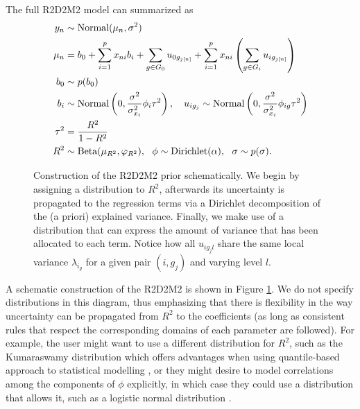 The full R2D2M2 model can summarized as
\begin{equation}
\label{r2d2m2model}
    \begin{aligned}
y_n & \sim \text{Normal} (\mu_n, \sigma^2) \\
\mu_n &= b_{0}+ \sum_{i=1}^p x_{ni} b_{i}+  \sum_{g\in G_0} u_{0 g_{j[n]}  }  + \sum_{i=1}^p x_{ni} \left( \sum_{g \in G_i} u_{i g_{j[n]}} \right) \\
b_{0}& \sim  p(b_{0}) \\
b_i &\sim \text{Normal} \left(0, \frac{\sigma^2}{\sigma_{x_i}^2}   \phi_i \tau^2\right), \quad
    u_{ig_j} \sim \text{Normal} \left(0, \frac{\sigma^2}{\sigma_{x_i}^2}   \phi_{ig} \tau^2\right) \\
    \tau^2&= \frac{R^2}{1-R^2}\\
R^2  &\sim \text{Beta} (\mu_{R^2},\varphi_{R^2}), \ \
     \phi \sim \text{Dirichlet} (\alpha), \ \
     \sigma \sim p(\sigma). \\
\end{aligned}
\end{equation}
\begin{figure}[t!]%
    \centering
    
  \caption{Construction of the R2D2M2 prior schematically. We begin by assigning a distribution to $R^2$, afterwards its uncertainty is propagated to the regression terms via a Dirichlet decomposition of the (a priori) explained variance. Finally, we make use of a distribution that can express the amount of variance that has been allocated to each term. Notice how all $u_{ig_jl}$ share the same local variance $\lambda_{i_g}$ for a given pair $(i, g_j)$ and varying level $l$. \\}
  \label{fig:r2d2prop2}
\end{figure}%
A schematic construction of the R2D2M2 is shown in Figure \ref{fig:r2d2prop2}. We do not specify distributions in this diagram, thus emphasizing that there is flexibility in the way uncertainty can be propagated from $R^2$ to the coefficients (as long as consistent rules that respect the corresponding domains of each parameter are followed). For example, the user might want to use a different distribution for $R^2$, such as the Kumaraswamy distribution which offers advantages when using quantile-based approach to statistical modelling \citep{Kumaraswamy}, or they might desire to model correlations among the components of $\phi$ explicitly, in which case they could use a distribution that allows it, such as a logistic normal distribution \citep{logisticnormal}.

